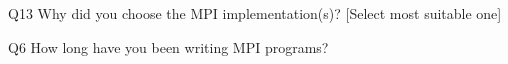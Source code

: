 \begin{description}%
\item{Q13} Why did you choose the MPI implementation(s)? [Select most suitable one]%
\item{Q6} How long have you been writing MPI programs?%
\end{description}%
